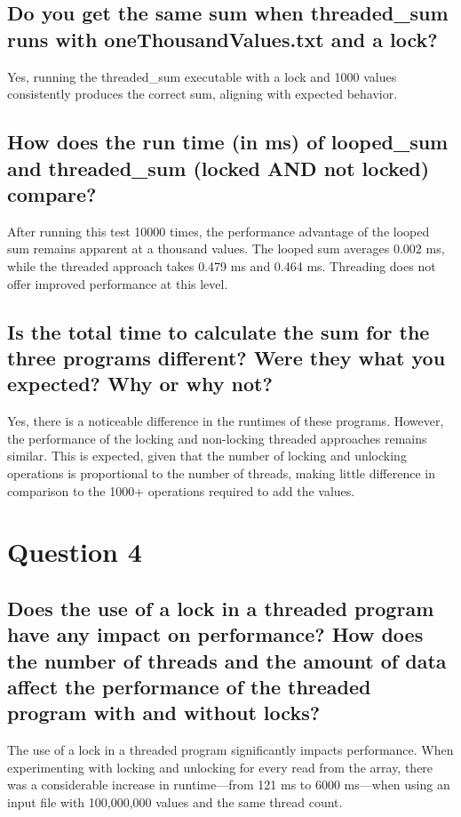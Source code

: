 \documentclass{assignment-x}
\begin{document}
\subsection{Do you get the same sum when threaded\_sum runs with oneThousandValues.txt and a lock?}
Yes, running the threaded\_sum executable with a lock and 1000 values consistently produces the correct sum, aligning with expected behavior.

\subsection{How does the run time (in ms) of looped\_sum and threaded\_sum (locked AND not locked) compare?}
After running this test 10000 times, the performance advantage of the looped sum remains apparent at a thousand values. The looped sum averages 0.002 ms, while the threaded approach takes 0.479 ms and 0.464 ms. Threading does not offer improved performance at this level.

\subsection{Is the total time to calculate the sum for the three programs different? Were they what you expected? Why or why not?}
Yes, there is a noticeable difference in the runtimes of these programs. However, the performance of the locking and non-locking threaded approaches remains similar. This is expected, given that the number of locking and unlocking operations is proportional to the number of threads, making little difference in comparison to the 1000+ operations required to add the values.

\section{Question 4}
\subsection{Does the use of a lock in a threaded program have any impact on performance? How does the number of threads and the amount of data affect the performance of the threaded program with and without locks?}
The use of a lock in a threaded program significantly impacts performance. When experimenting with locking and unlocking for every read from the array, there was a considerable increase in runtime—from 121 ms to 6000 ms—when using an input file with 100,000,000 values and the same thread count.
\end{document}

